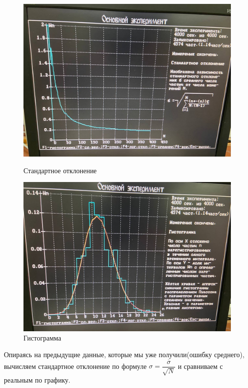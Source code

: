 	\newpage
	\begin{figure}
		\includegraphics[width=\linewidth ]{3}
		\caption{Стандартное отклонение}
	


	\includegraphics[width=\linewidth ]{4}
	\caption{Гистограмма}
\end{figure}
Опираясь на предыдущие данные, которые мы уже получили(ошибку среднего), вычисляем стандартное отклонение по формуле $\sigma = \dfrac{\overline{\sigma}}{\sqrt{N}}$ и сравниваем с реальным по графику.
\newline
\bigskip
\\
\\
\\
\\
